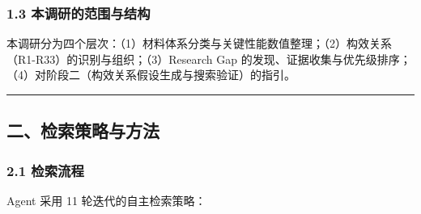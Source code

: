 \documentclass[12pt,a4paper]{ctexart}
\begin{document}
\subsubsection{1.3 本调研的范围与结构}\label{ux672cux8c03ux7814ux7684ux8303ux56f4ux4e0eux7ed3ux6784}

本调研分为四个层次：（1）材料体系分类与关键性能数值整理；（2）构效关系（R1-R33）的识别与组织；（3）Research Gap 的发现、证据收集与优先级排序；（4）对阶段二（构效关系假设生成与搜索验证）的指引。

\begin{center}\rule{0.5\linewidth}{0.5pt}\end{center}

\subsection{二、检索策略与方法}\label{ux4e8cux68c0ux7d22ux7b56ux7565ux4e0eux65b9ux6cd5}

\subsubsection{2.1 检索流程}\label{ux68c0ux7d22ux6d41ux7a0b}

Agent 采用 11 轮迭代的自主检索策略：
\end{document}
